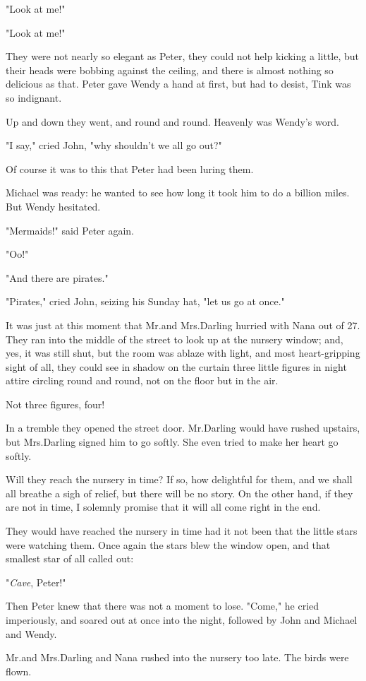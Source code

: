 "Look at me!"

"Look at me!"

They were not nearly so elegant as Peter, they could not help kicking a little,
but their heads were bobbing against the ceiling,
and there is almost nothing so delicious as that.
Peter gave Wendy a hand at first, but had to desist, Tink was so indignant.

Up and down they went, and round and round.
Heavenly was Wendy's word.

"I say," cried John, "why shouldn't we all go out?"

Of course it was to this that Peter had been luring them.

Michael was ready:
he wanted to see how long it took him to do a billion miles.
But Wendy hesitated.

"Mermaids!\@" said Peter again.

"Oo!"

"And there are pirates."

"Pirates," cried John, seizing his Sunday hat, "let us go at once."

It was just at this moment that Mr.\@ and Mrs.\@ Darling hurried with Nana out of 27.
They ran into the middle of the street to look up at the nursery window;
and, yes, it was still shut,
but the room was ablaze with light,
and most heart-gripping sight of all,
they could see in shadow on the curtain three little figures in night attire circling round and round,
not on the floor but in the air.

Not three figures, four!

In a tremble they opened the street door.
Mr.\@ Darling would have rushed upstairs, but Mrs.\@ Darling signed him to go softly.
She even tried to make her heart go softly.

Will they reach the nursery in time?
If so, how delightful for them, and we shall all breathe a sigh of relief, but there will be no story.
On the other hand, if they are not in time, I solemnly promise that it will all come right in the end.

They would have reached the nursery in time had it not been that the little stars were watching them.
Once again the stars blew the window open, and that smallest star of all called out:

"\emph{Cave}, Peter!"

Then Peter knew that there was not a moment to lose.
"Come," he cried imperiously, and soared out at once into the night,
followed by John and Michael and Wendy.

Mr.\@ and Mrs.\@ Darling and Nana rushed into the nursery too late.
The birds were flown.

\endinput
